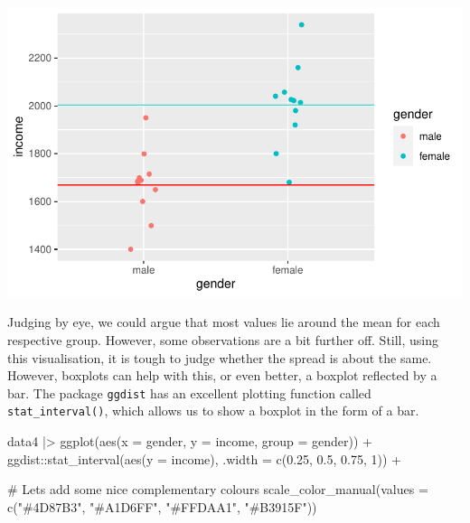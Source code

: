 \documentclass[
  letterpaper,
]{krantz}
\makeatletter
\newenvironment{Shaded}{\begin{snugshade}}{\end{snugshade}}
\newcommand{\AttributeTok}[1]{\textcolor[rgb]{0.40,0.45,0.13}{#1}}
\newcommand{\CommentTok}[1]{\textcolor[rgb]{0.37,0.37,0.37}{#1}}
\newcommand{\DecValTok}[1]{\textcolor[rgb]{0.68,0.00,0.00}{#1}}
\newcommand{\FloatTok}[1]{\textcolor[rgb]{0.68,0.00,0.00}{#1}}
\newcommand{\FunctionTok}[1]{\textcolor[rgb]{0.28,0.35,0.67}{#1}}
\newcommand{\NormalTok}[1]{\textcolor[rgb]{0.00,0.23,0.31}{#1}}
\newcommand{\SpecialCharTok}[1]{\textcolor[rgb]{0.37,0.37,0.37}{#1}}
\newcommand{\StringTok}[1]{\textcolor[rgb]{0.13,0.47,0.30}{#1}}
\newenvironment{kframe}{%
\medskip{}
\setlength{\fboxsep}{.8em}
 \def\at@end@of@kframe{}%
 \ifinner\ifhmode%
  \def\at@end@of@kframe{\end{minipage}}%
  \begin{minipage}{\columnwidth}%
 \fi\fi%
 \def\FrameCommand##1{\hskip\@totalleftmargin \hskip-\fboxsep
 \colorbox{shadecolor}{##1}\hskip-\fboxsep
     \hskip-\linewidth \hskip-\@totalleftmargin \hskip\columnwidth}%
 \MakeFramed {\advance\hsize-\width
   \@totalleftmargin\z@ \linewidth\hsize
   \@setminipage}}%
 {\par\unskip\endMakeFramed%
 \at@end@of@kframe}
\renewenvironment{Shaded}{\begin{kframe}}{\end{kframe}}
\makeatother
\begin{document}
\includegraphics{09_sources_of_bias_files/figure-pdf/homogeneity-variance-1.pdf}

Judging by eye, we could argue that most values lie around the mean for
each respective group. However, some observations are a bit further off.
Still, using this visualisation, it is tough to judge whether the spread
is about the same. However, boxplots can help with this, or even better,
a boxplot reflected by a bar. The package \texttt{ggdist} has an
excellent plotting function called \texttt{stat\_interval()}, which
allows us to show a boxplot in the form of a bar.

\begin{Shaded}
\begin{Highlighting}[]
\NormalTok{data4 }\SpecialCharTok{|\textgreater{}}
  \FunctionTok{ggplot}\NormalTok{(}\FunctionTok{aes}\NormalTok{(}\AttributeTok{x =}\NormalTok{ gender, }\AttributeTok{y =}\NormalTok{ income, }\AttributeTok{group =}\NormalTok{ gender)) }\SpecialCharTok{+}
\NormalTok{  ggdist}\SpecialCharTok{::}\FunctionTok{stat\_interval}\NormalTok{(}\FunctionTok{aes}\NormalTok{(}\AttributeTok{y =}\NormalTok{ income),}
                        \AttributeTok{.width =} \FunctionTok{c}\NormalTok{(}\FloatTok{0.25}\NormalTok{, }\FloatTok{0.5}\NormalTok{, }\FloatTok{0.75}\NormalTok{, }\DecValTok{1}\NormalTok{)) }\SpecialCharTok{+}

  \CommentTok{\# Let\textquotesingle{}s add some nice complementary colours}
  \FunctionTok{scale\_color\_manual}\NormalTok{(}\AttributeTok{values =} \FunctionTok{c}\NormalTok{(}\StringTok{"\#4D87B3"}\NormalTok{, }\StringTok{"\#A1D6FF"}\NormalTok{, }\StringTok{"\#FFDAA1"}\NormalTok{, }\StringTok{"\#B3915F"}\NormalTok{))}
\end{Highlighting}
\end{Shaded}
\end{document}
